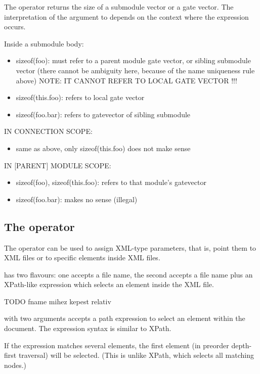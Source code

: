 The  operator returns the size
of a submodule vector or a gate vector. The interpretation of the
argument to  depends on the context where the
expression occurs.

Inside a submodule body:
\begin{itemize}
  \item sizeof(foo): must refer to a parent module gate vector, or
                     sibling submodule vector (there cannot be ambiguity
                     here, because of the name uniqueness rule above)
                     NOTE: IT CANNOT REFER TO LOCAL GATE VECTOR !!!
  \item sizeof(this.foo): refers to local gate vector
  \item sizeof(foo.bar): refers to gatevector of sibling submodule
\end{itemize}

IN CONNECTION SCOPE:
\begin{itemize}
  \item same as above, only sizeof(this.foo) does not make sense
\end{itemize}

IN [PARENT] MODULE SCOPE:
\begin{itemize}
  \item sizeof(foo), sizeof(this.foo): refers to that module's gatevector
  \item sizeof(foo.bar): makes no sense (illegal)
\end{itemize}


\subsection{The  operator}

The  operator can be used to assign XML-type parameters,
that is, point them to XML files or to specific elements inside XML files.

 has two flavours: one accepts a file name, the second accepts
a file name plus an XPath-like expression which selects an element
inside the XML file.

TODO fname mihez kepest relativ

 with two arguments accepts a path expression
to select an element within the document. The expression syntax is
similar to XPath.

If the expression matches several elements, the first element
(in preorder depth-first traversal) will be selected. (This is
unlike XPath, which selects all matching nodes.)

